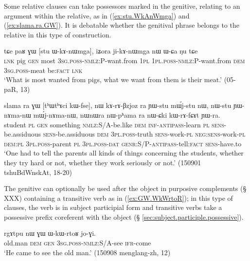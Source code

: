 Some relative clauses can take possessors marked in the genitive, relating to an argument within the relative, as in  (\ref{ex:stu.WkAnWmga}) and (\ref{ex:slama.ra.GW}). It is debatable whether the genitival phrase belongs to the relative in this type of construction.

\begin{exe}
\ex \label{ex:stu.WkAnWmga}
 \gll tɕe paʁ ɣɯ [stu ɯ-kɤ-nɯmga], iʑora ji-kɤ-nɯmga nɯ ɯ-ɕa ŋu tɕe \\
 \textsc{lnk} pig \textsc{gen} most \textsc{3sg}.\textsc{poss}-\textsc{nmlz}:P-want.from \textsc{1pl} \textsc{1pl}.\textsc{poss}-\textsc{nmlz}:P-want.from \textsc{dem} \textsc{3sg}.\textsc{poss}-meat be:\textsc{fact} \textsc{lnk} \\
\glt  `What is most wanted from pigs, what we want from them is their meat.' (05-paR, 13)
\end{exe}

\begin{exe}
\ex \label{ex:slama.ra.GW}
\gll  slama ra ɣɯ [tʰɯtʰɤci kɯ-fse], nɯ kɤ-rɤ-βzjoz ra ɲɯ-stu mɯ́j-stu nɯ, nɯ-stu ɲɯ-nɤma-nɯ mɯ́j-nɤma-nɯ,  nɯnɯra nɯ-pʰama ra nɯ-ɕki kɯ-rɤ-fɕɤt ɲɯ-ra. \\
student \textsc{pl} \textsc{gen} something \textsc{nmlz}:S/A-be.like \textsc{dem}  \textsc{inf}-\textsc{antipass}-learn \textsc{pl} \textsc{sens}-be.assiduous \textsc{sens}-be.assiduous \textsc{dem} \textsc{3pl}.\textsc{poss}-truth \textsc{sens}-work-\textsc{pl} \textsc{neg:sens}-work-\textsc{pl} \textsc{dem}:\textsc{pl} \textsc{3pl}.\textsc{poss}-parent \textsc{pl} \textsc{3pl}.\textsc{poss}-\textsc{dat} \textsc{genr}:S/P-\textsc{antipass}-tell:\textsc{fact} \textsc{sens}-have.to \\
\glt `One had to tell the parents all kinds of things concerning the students, whether they try hard or not, whether they work seriously or not.' (150901 tshuBdWnskAt, 18-20)
\end{exe}

The genitive  can optionally be used after the object in purposive complements (§ XXX) containing a transitive verb as in (\ref{ex:GW.WkWrtoR}); in this type of clauses, the verb is in subject participial form and transitive verbs take a possessive prefix coreferent with the object (§ \ref{sec:subject.participle.possessive}).

\begin{exe}
\ex \label{ex:GW.WkWrtoR}
\gll rgɤtpu nɯ ɣɯ ɯ-kɯ-rtoʁ jo-ɣi. \\
old.man \textsc{dem} \textsc{gen} \textsc{3sg}.\textsc{poss}-\textsc{nmlz}:S/A-see \textsc{ifr}-come \\
\glt `He came to see the old man.' (150908 menglang-zh, 12)
\end{exe}

